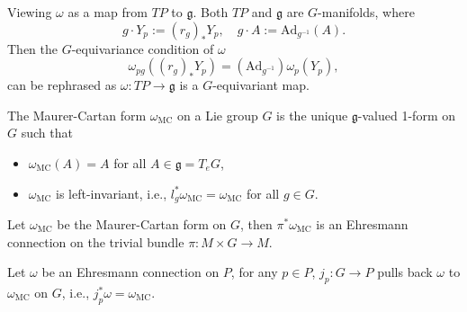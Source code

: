 Viewing $\omega$ as a map from $TP$ to $\mathfrak{g}$. Both $TP$ and $\mathfrak{g}$ are $G$-manifolds, 
where
\begin{equation*}
    g\cdot Y_p := (r_g)_*Y_p, \quad g\cdot A := \mathrm{Ad}_{g^{-1}}(A). 
\end{equation*}
Then the $G$-equivariance condition of $\omega$ 
\begin{equation*}
    \omega_{pg}((r_g)_*Y_p) = (\mathrm{Ad}_{g^{-1}})\omega_p(Y_p),
\end{equation*}
can be rephrased as $\omega: TP\to \mathfrak{g}$ is a $G$-equivariant map.

\begin{example}
    The Maurer-Cartan form $\omega_{\mathrm{MC}}$ on a Lie group $G$ is the unique $\mathfrak{g}$-valued 1-form on $G$ 
    such that 
    \begin{itemize}
        \item $\omega_{\mathrm{MC}}(A) = A$ for all $A\in\mathfrak{g}=T_eG$, 
        \item $\omega_{\mathrm{MC}}$ is left-invariant, i.e., $l_g^*\omega_{\mathrm{MC}} = \omega_{\mathrm{MC}}$ for all $g\in G$. 
    \end{itemize}
    Let $\omega_{\mathrm{MC}}$ be the Maurer-Cartan form on $G$, 
    then $\pi^*\omega_{\mathrm{MC}}$ is an Ehresmann connection on the trivial bundle $\pi:M\times G\to M$.
\end{example}

\begin{remark}
    Let $\omega$ be an Ehresmann connection on $P$, for any $p\in P$, 
    $j_p: G\to P$ pulls back $\omega$ to  $\omega_{\mathrm{MC}}$ on $G$, i.e., 
    $j_p^*\omega = \omega_{\mathrm{MC}}$.
\end{remark}



